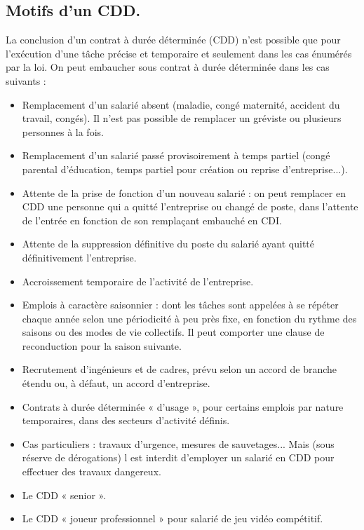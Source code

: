 \subsection{Motifs d'un CDD.}
	La conclusion d’un contrat à durée déterminée (CDD) n’est possible que pour l’exécution d’une tâche précise et temporaire et seulement dans les cas énumérés par la loi.
	On peut embaucher sous contrat à durée déterminée dans les cas suivants :
	\begin{itemize}
		\item[\textbullet] Remplacement d’un salarié absent (maladie, congé maternité, accident du travail, congés). Il n'est pas possible de remplacer un gréviste ou plusieurs personnes à la fois.
		\item[\textbullet] Remplacement d’un salarié passé provisoirement à temps partiel (congé parental d’éducation, temps partiel pour création ou reprise d’entreprise...).
		\item[\textbullet] Attente de la prise de fonction d’un nouveau salarié : on peut remplacer en CDD une personne qui a quitté l'entreprise ou changé de poste, dans l’attente de l’entrée en fonction de son remplaçant embauché en CDI.
		\item[\textbullet] Attente de la suppression définitive du poste du salarié ayant quitté définitivement l’entreprise.
		\item[\textbullet] Accroissement temporaire de l’activité de l’entreprise.
		\item[\textbullet] Emplois à caractère saisonnier : dont les tâches sont appelées à se répéter chaque année selon une périodicité à peu près fixe, en fonction du rythme des saisons ou des modes de vie collectifs. Il peut comporter une clause de reconduction pour la saison suivante.
		\item[\textbullet] Recrutement d’ingénieurs et de cadres, prévu selon un accord de branche étendu ou, à défaut, un accord d’entreprise.
		\item[\textbullet] Contrats à durée déterminée « d’usage », pour certains emplois par nature temporaires, dans des secteurs d'activité définis.
		\item[\textbullet] Cas particuliers : travaux d'urgence, mesures de sauvetages... Mais (sous réserve de dérogations) l est interdit d’employer un salarié en CDD pour effectuer des travaux dangereux.
		\item[\textbullet] Le CDD « senior ».
		\item[\textbullet] Le CDD « joueur professionnel » pour salarié de jeu vidéo compétitif.
	\end{itemize}

